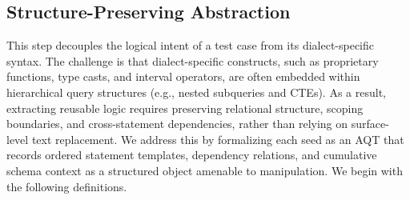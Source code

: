 \documentclass[conference]{IEEEtran}
\newcommand{\tool}{\textsc{Morph}\xspace}
\begin{document}

\subsection{Structure-Preserving Abstraction}
\label{sec:abstraction}
This step decouples the logical intent of a test case from its dialect-specific syntax.
The challenge is that dialect-specific constructs, such as proprietary functions, type casts, and interval operators, are often embedded within hierarchical query structures (e.g., nested subqueries and CTEs).
As a result, extracting reusable logic requires preserving relational structure, scoping boundaries, and cross-statement dependencies, rather than relying on surface-level text replacement.
We address this by formalizing each seed as an AQT that records ordered statement templates, dependency relations, and cumulative schema context as a structured object amenable to manipulation.
We begin with the following definitions.
\end{document}
